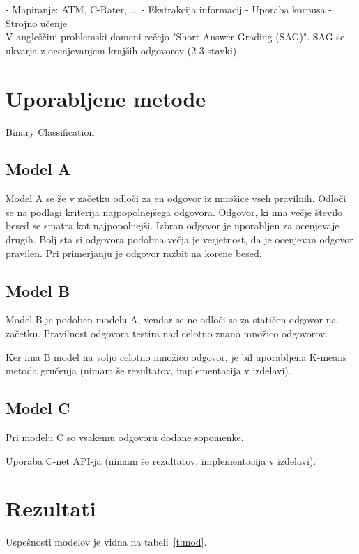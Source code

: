 \documentclass[journal]{IEEEtran}
\begin{document}
- Mapiranje: ATM, C-Rater, ...
- Ekstrakcija informacij
- Uporaba korpusa
- Strojno učenje\\

V angleščini problemski domeni rečejo "Short Answer Grading (SAG)". SAG se ukvarja z ocenjevanjem krajših odgovorov (2-3 stavki).


\section{Uporabljene metode}
Binary Classification

\subsection{Model A}
Model A se že v začetku odloči za en odgovor iz množice vseh pravilnih. Odloči se na podlagi kriterija najpopolnejšega odgovora. Odgovor, ki ima večje število besed se smatra kot najpopolnejši.
Izbran odgovor je uporabljen za ocenjevaje drugih. Bolj sta si odgovora podobna večja je verjetnost, da je ocenjevan odgovor pravilen. Pri primerjanju je odgovor razbit na korene besed.

\subsection{Model B}
Model B je podoben modelu A, vendar se ne odloči se za statičen odgovor na začetku. Pravilnost odgovora testira nad celotno znano množico odgovorov.

Ker ima B model na voljo celotno množico odgovor, je bil uporabljena K-means metoda gručenja (nimam še rezultatov, implementacija v izdelavi).


\subsection{Model C}
Pri modelu C so vsakemu odgovoru dodane sopomenke. 

Uporaba C-net API-ja (nimam še rezultatov, implementacija v izdelavi).

\section{Rezultati}
Uspešnosti modelov je vidna na tabeli~\ref{t:mod}.
\end{document}

